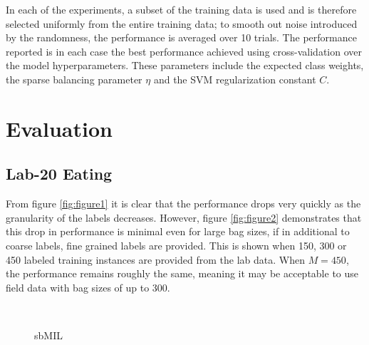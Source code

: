 \documentclass{sigchi}
\begin{document}
In each of the experiments, a subset of the training data is used and is therefore selected uniformly from the entire training data; to smooth out noise introduced by the randomness, the performance is averaged over 10 trials. The performance reported is in each case the best performance achieved using cross-validation over the model hyperparameters. These parameters include the expected class weights, the sparse balancing parameter $\eta$ and the SVM regularization constant $C$.

\section{Evaluation}

\subsection{Lab-20 Eating}

From figure \ref{fig:figure1} it is clear that the performance drops very quickly as the granularity of the labels decreases. However, figure \ref{fig:figure2} demonstrates that this drop in performance is minimal even for large bag sizes, if in additional to coarse labels, fine grained labels are provided. This is shown when 150, 300 or 450 labeled training instances are provided from the lab data. When $M = 450$, the performance remains roughly the same, meaning it may be acceptable to use field data with bag sizes of up to 300.

\begin{figure}
  \centering
  \qquad
  \qquad
  \caption{sbMIL }~\label{fig:figure3}
\end{figure}
\end{document}
